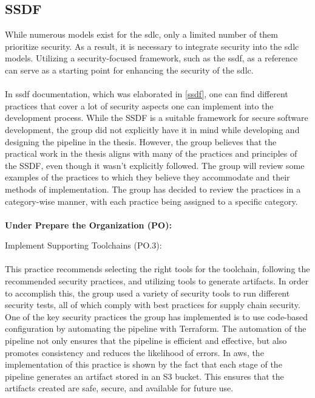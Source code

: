 \subsection{SSDF}
While numerous models exist for the \acrlong{sdlc}, only a limited number of them prioritize security. As a result, it is necessary to integrate security into the \acrshort{sdlc} models. Utilizing a security-focused framework, such as the \acrshort{ssdf}, as a reference can serve as a starting point for enhancing the security of the \acrshort{sdlc}. 
\\~\\
In \acrshort{ssdf} documentation, which was elaborated in \ref{ssdf}, one can find different practices that cover a lot of security aspects one can implement into the development process. While the SSDF is a suitable framework for secure software development, the group did not explicitly have it in mind while developing and designing the pipeline in the thesis. However, the group believes that the practical work in the thesis aligns with many of the practices and principles of the SSDF, even though it wasn't explicitly followed. The group will review some examples of the practices to which they believe they accommodate and their methods of implementation. The group has decided to review the practices in a category-wise manner, with each practice being assigned to a specific category. 
\\~\\
\textbf{Under Prepare the Organization (PO):}

Implement Supporting Toolchains (PO.3): \cite{ssdf}
\\~\\
This practice recommends selecting the right tools for the toolchain, following the recommended security practices, and utilizing tools to generate artifacts. In order to accomplish this, the group used a variety of security tools to run different security tests, all of which comply with best practices for supply chain security. One of the key security practices the group has implemented is to use code-based configuration by automating the pipeline with Terraform. The automation of the pipeline not only ensures that the pipeline is efficient and effective, but also promotes consistency and reduces the likelihood of errors. In \acrshort{aws}, the implementation of this practice is shown by the fact that each stage of the pipeline generates an artifact stored in an S3 bucket. This ensures that the artifacts created are safe, secure, and available for future use.
\\~\\

